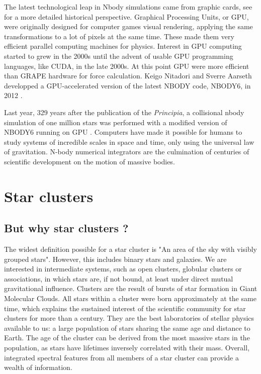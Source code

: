 The latest technological leap in Nbody simulations came from graphic cards, see \cite{Bedorf2012} for a more detailed historical perspective. Graphical Processing Units, or GPU, were originally designed for computer games visual rendering, applying the same transformations to a lot of pixels at the same time. These made them very efficient parallel computing machines for physics. Interest in GPU computing started to grew in the 2000s \citep{Nyland2004,Elsen2006,SPZ2007} until the advent of usable GPU programming languages, like CUDA, in the late 2000s. At this point GPU were more efficient than GRAPE hardware for force calculation. Keigo Nitadori and Sverre Aarseth developped a GPU-accelerated version of the latest NBODY code, NBODY6, in 2012 \citep{Nitadori2012}.

Last year, 329 years after the publication of the \textit{Principia}, a collisional nbody simulation of one million stars was performed with a modified version of NBODY6 running on GPU \citep{Wang2015}. Computers have made it possible for humans to study systems of incredible scales in space and time, only using the universal law of gravitation. N-body numerical integrators are the culmination of centuries of scientific development on the motion of massive bodies.



\newpage
\section{Star clusters}

\subsection{But why star clusters ?}

The widest definition possible for a star cluster is "An area of the sky with visibly grouped stars". However, this includes binary stars and galaxies. We are interested in intermediate systems, such as open clusters, globular clusters or associations, in which stars are, if not bound, at least under direct mutual gravitational influence. 
Clusters are the result of bursts of star formation in Giant Molecular Clouds. All stars within a cluster were born approximately at the same time, which explains the sustained interest of the scientific community for star clusters for more than a century. They are the best laboratories of stellar physics available to us: a large population of stars sharing the same age and distance to Earth. The age of the cluster can be derived from the most massive stars in the population, as stars have lifetimes inversely correlated with their mass. Overall, integrated spectral features from all members of a star cluster can provide a wealth of information.





